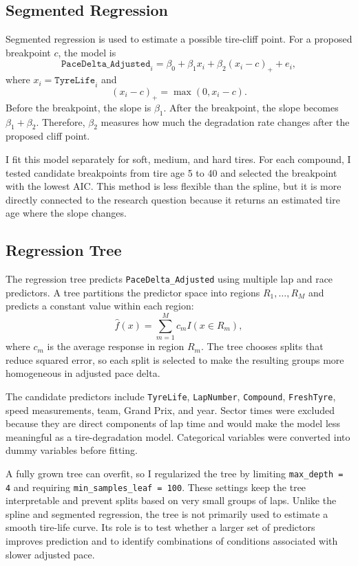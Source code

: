 \documentclass[11pt]{article}
\begin{document}
\subsection{Segmented Regression}

Segmented regression is used to estimate a possible tire-cliff point. For a proposed breakpoint $c$, the model is
\[
\texttt{PaceDelta\_Adjusted}_i = \beta_0 + \beta_1 x_i + \beta_2 (x_i-c)_+ + e_i,
\]
where $x_i = \texttt{TyreLife}_i$ and
\[
(x_i-c)_+ = \max(0, x_i-c).
\]
Before the breakpoint, the slope is $\beta_1$. After the breakpoint, the slope becomes $\beta_1 + \beta_2$. Therefore, $\beta_2$ measures how much the degradation rate changes after the proposed cliff point.

I fit this model separately for soft, medium, and hard tires. For each compound, I tested candidate breakpoints from tire age 5 to 40 and selected the breakpoint with the lowest AIC. This method is less flexible than the spline, but it is more directly connected to the research question because it returns an estimated tire age where the slope changes.

\subsection{Regression Tree}

The regression tree predicts \texttt{PaceDelta\_Adjusted} using multiple lap and race predictors. A tree partitions the predictor space into regions $R_1, \ldots, R_M$ and predicts a constant value within each region:
\[
\hat{f}(x) = \sum_{m=1}^{M} c_m I(x \in R_m),
\]
where $c_m$ is the average response in region $R_m$. The tree chooses splits that reduce squared error, so each split is selected to make the resulting groups more homogeneous in adjusted pace delta.

The candidate predictors include \texttt{TyreLife}, \texttt{LapNumber}, \texttt{Compound}, \texttt{FreshTyre}, speed measurements, team, Grand Prix, and year. Sector times were excluded because they are direct components of lap time and would make the model less meaningful as a tire-degradation model. Categorical variables were converted into dummy variables before fitting.

A fully grown tree can overfit, so I regularized the tree by limiting \texttt{max\_depth = 4} and requiring \texttt{min\_samples\_leaf = 100}. These settings keep the tree interpretable and prevent splits based on very small groups of laps. Unlike the spline and segmented regression, the tree is not primarily used to estimate a smooth tire-life curve. Its role is to test whether a larger set of predictors improves prediction and to identify combinations of conditions associated with slower adjusted pace.
\end{document}
